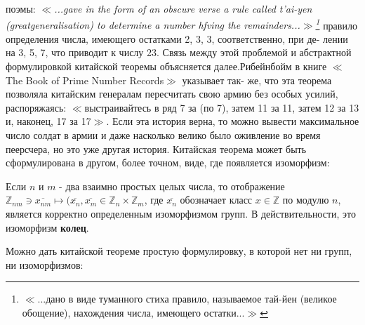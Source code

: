 \documentclass{mai_book}
\begin{document}
поэмы: \textit{$\ll$...gave in the form of an obscure verse a rule called t'ai-yen (great\linebreak generalisation) to determine a number hfving the remainders...$\gg$\footnote{$\ll$...дано в виде туманного стиха правило, называемое тай-йен (великое обощение), нахождения числа, имеющего остатки...$\gg$}} правило \linebreak определения числа, имеющего остатками 2, 3, 3, соответственно, при де- \linebreak лении на 3, 5, 7, что приводит к числу 23. Связь между этой проблемой \linebreak и абстрактной формулировкой китайской теоремы объясняется далее.\linebreak Рибейнбойм в книге $\ll$The Book of Prime Number Records$\gg$ указывает так- \linebreak же, что эта теорема позволяла китайским генералам пересчитать свою \linebreak армию без особых усилий, распоряжаясь: $\ll$выстраивайтесь в ряд 7 за (по 7), затем 11 за 11, затем 12 за 13 и, наконец, 17 за 17$\gg$. Если эта \linebreak история верна, то можно вывести максимальное число солдат в армии \linebreak и даже насколько велико было оживление во время пеерсчера, но это \linebreak уже другая история. Китайская теорема может быть сформулирована \linebreak в другом, более точном, виде, где появляется изоморфизм:  
\begin{thm}

  Если $n$ и $m$ - два взаимно простых целых числа, то отображение\linebreak
$\mathbb{Z}_{nm}\ni \overline{x_{nm}}\mapsto(\overline{x_n},\overline{x_m}\in \mathbb{Z}_n \times\mathbb{Z}_m$, где $\overline{x_n}$ обозначает класс $x \in \mathbb{Z}$ по \linebreak модулю $n$, является корректно определенным изоморфизмом групп. В \linebreak действительности, это изоморфизм \textbf{колец}.
 \end{thm}
  Можно дать китайской теореме простую формулировку, в которой \linebreak нет ни групп, ни изоморфизмов:   
\end{document}
